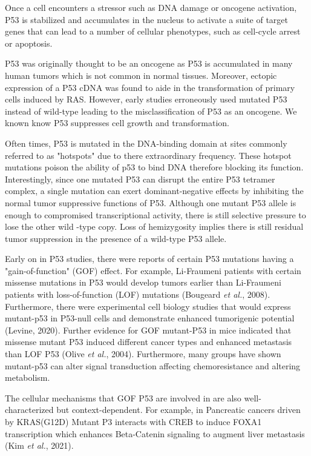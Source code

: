 Once a cell encounters a stressor such as DNA damage or oncogene activation, P53 is stabilized and accumulates in the nucleus to activate a suite of target genes that can lead to a number of cellular phenotypes, such as cell-cycle arrest or apoptosis.

P53 was originally thought to be an oncogene as P53 is accumulated in many human tumors which is not common in normal tissues. Moreover, ectopic expression of a P53 cDNA was found to aide in the transformation of primary cells induced by RAS. However, early studies erroneously used mutated P53 instead of wild-type leading to the misclassification of P53 as an oncogene. We known know P53 suppresses cell growth and transformation.

Often times, P53 is mutated in the DNA-binding domain at sites commonly referred to as "hotspots" due to there extraordinary frequency. These hotspot mutations poison the ability of p53 to bind DNA therefore blocking its function. Interestingly, since one mutated P53 can disrupt the entire P53 tetramer complex, a single mutation can exert dominant-negative effects by inhibiting the normal tumor suppressive functions of P53. Although one mutant P53 allele is enough to compromised transcriptional activity, there is still selective pressure to lose the other wild -type copy. Loss of hemizygosity implies there is still residual tumor suppression in the presence of a wild-type P53 allele.

Early on in P53 studies, there were reports of certain P53 mutations having a "gain-of-function" (GOF) effect. For example, Li-Fraumeni patients with certain missense mutations in P53 would develop tumors earlier than Li-Fraumeni patients with loss-of-function (LOF) mutations (Bougeard \emph{et al.}, 2008). Furthermore, there were experimental cell biology studies that would express mutant-p53 in P53-null cells and demonstrate enhanced tumorigenic potential (Levine, 2020). Further evidence for GOF mutant-P53 in mice indicated that missense mutant P53 induced different cancer types and enhanced metastasis than LOF P53 (Olive \emph{et al.}, 2004). Furthermore, many groups have shown mutant-p53 can alter signal transduction affecting chemoresistance and altering metabolism.

The cellular mechanisms that GOF P53 are involved in are also well-characterized but context-dependent. For example, in Pancreatic cancers driven by KRAS(G12D) Mutant P3 interacts with CREB to induce FOXA1 transcription which enhances Beta-Catenin signaling to augment liver metastasis (Kim \emph{et al.}, 2021).

